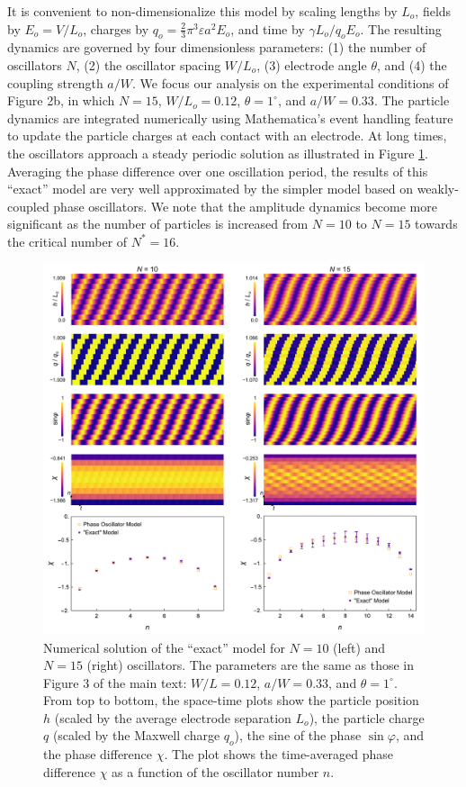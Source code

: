 \begin{appendices}
It is convenient to non-dimensionalize this model by scaling lengths by $L_o$, fields by $E_o=V/L_o$, charges by $q_o=\tfrac{2}{3}\pi^3 \varepsilon a^2 E_o$, and time by $\gamma L_o/q_o E_o$.  The resulting dynamics are governed by four dimensionless parameters: (1) the number of oscillators $N$, (2) the oscillator spacing $W/L_o$, (3) electrode angle $\theta$, and (4) the coupling strength $a/W$.  We focus our analysis on the experimental conditions of Figure 2b, in which $N=15$, $W/L_o=0.12$, $\theta=1^{\circ}$, and $a/W=0.33$. The particle dynamics are integrated numerically using Mathematica's event handling feature to update the particle charges at each contact with an electrode.  At long times, the oscillators approach a steady periodic solution as illustrated in Figure \ref{fig:amplitude}.  Averaging the phase difference over one oscillation period, the results of this ``exact'' model are very well approximated by the simpler model based on weakly-coupled phase oscillators.  We note that the amplitude dynamics become more significant as the number of particles is increased from $N=10$ to $N=15$ towards the critical number of $N^*=16$.

\begin{figure}
    \centering
    \includegraphics[width=\textwidth]{figures/A2_amplitudeDynamics.pdf}
    \caption{Numerical solution of the ``exact'' model for $N=10$ (left) and $N=15$ (right) oscillators.  The parameters are the same as those in Figure 3 of the main text: $W/L=0.12$, $a/W=0.33$, and $\theta=1^{\circ}$.  From top to bottom, the space-time plots show the particle position $h$ (scaled by the average electrode separation $L_o$), the particle charge $q$ (scaled by the Maxwell charge $q_o$), the sine of the phase $\sin\varphi$, and the phase difference $\chi$.  The plot shows the time-averaged phase difference $\chi$ as a function of the oscillator number $n$.}
    \label{fig:amplitude}
\end{figure}


\end{appendices}
